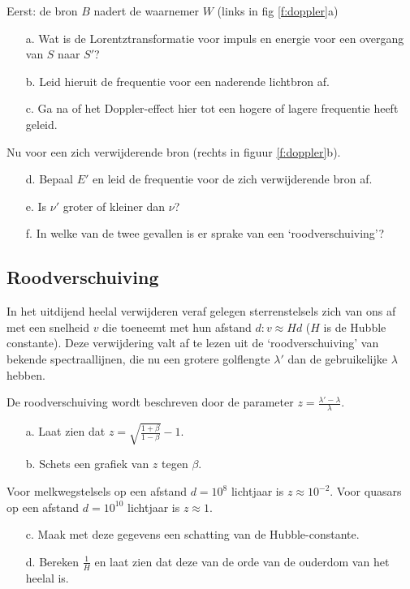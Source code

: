 Eerst: de bron $B$ nadert de waarnemer $W$ (links in fig \ref{f:doppler}a)
\begin{itemize}
\item [a.]
Wat is de Lorentztransformatie voor impuls en energie voor een overgang van
$S$ naar $S'$?
\item [b.]
Leid hieruit de frequentie voor een naderende lichtbron af.
\item [c.]
Ga na of het Doppler-effect hier tot een hogere of lagere frequentie heeft 
geleid.
\end{itemize}
Nu voor een zich verwijderende bron (rechts in figuur \ref{f:doppler}b).
\begin{itemize}
\item [d.]
Bepaal $E'$ en leid de frequentie voor de zich verwijderende bron af.
\item [e.]
Is $\nu '$ groter of kleiner dan $\nu $?
\item [f.]
In welke van de twee gevallen is er sprake van een `roodverschuiving'?
\end{itemize}

\subsection{Roodverschuiving}
In het uitdijend heelal verwijderen veraf gelegen sterrenstelsels zich van ons
af met een snelheid $v$ die toeneemt met hun afstand $d : v \approx Hd$ 
($H$ is de Hubble constante).
Deze verwijdering valt af te lezen uit de `roodverschuiving' van bekende 
spectraallijnen, die nu een grotere golflengte $\lambda '$ dan de 
gebruikelijke $\lambda$ hebben.

De roodverschuiving wordt beschreven door de parameter 
$z = \frac{\lambda ' - \lambda}{\lambda}$.
\begin{itemize}
\item [a.]
Laat zien dat $z = \sqrt{\frac{1 + \beta}{1 - \beta}} -1$.
\item [b.]
Schets een grafiek van $z$ tegen $\beta$.
\end{itemize}
Voor melkwegstelsels op een afstand $d = 10^{8}$   lichtjaar is 
$z \approx 10^{-2}$.
Voor quasars op een afstand $d = 10^{10}$ lichtjaar is $z \approx 1$.
\begin{itemize}
\item [c.]
Maak met deze gegevens een schatting van de Hubble-constante.
\item [d.]
Bereken $\frac{1}{H}$ en laat zien dat deze van de orde van de ouderdom van het heelal is.
\end{itemize}

